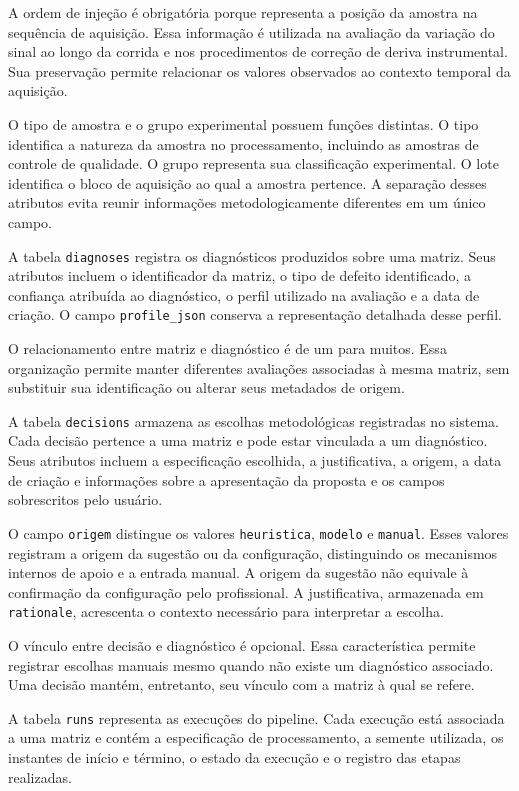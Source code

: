 A ordem de injeção é obrigatória porque representa a posição da amostra na sequência de aquisição. Essa informação é utilizada na avaliação da variação do sinal ao longo da corrida e nos procedimentos de correção de deriva instrumental. Sua preservação permite relacionar os valores observados ao contexto temporal da aquisição.

O tipo de amostra e o grupo experimental possuem funções distintas. O tipo identifica a natureza da amostra no processamento, incluindo as amostras de controle de qualidade. O grupo representa sua classificação experimental. O lote identifica o bloco de aquisição ao qual a amostra pertence. A separação desses atributos evita reunir informações metodologicamente diferentes em um único campo.

A tabela \texttt{diagnoses} registra os diagnósticos produzidos sobre uma matriz. Seus atributos incluem o identificador da matriz, o tipo de defeito identificado, a confiança atribuída ao diagnóstico, o perfil utilizado na avaliação e a data de criação. O campo \texttt{profile\_json} conserva a representação detalhada desse perfil.

O relacionamento entre matriz e diagnóstico é de um para muitos. Essa organização permite manter diferentes avaliações associadas à mesma matriz, sem substituir sua identificação ou alterar seus metadados de origem.

A tabela \texttt{decisions} armazena as escolhas metodológicas registradas no sistema. Cada decisão pertence a uma matriz e pode estar vinculada a um diagnóstico. Seus atributos incluem a especificação escolhida, a justificativa, a origem, a data de criação e informações sobre a apresentação da proposta e os campos sobrescritos pelo usuário.

O campo \texttt{origem} distingue os valores \texttt{heuristica}, \texttt{modelo} e \texttt{manual}. Esses valores registram a origem da sugestão ou da configuração, distinguindo os mecanismos internos de apoio e a entrada manual. A origem da sugestão não equivale à confirmação da configuração pelo profissional. A justificativa, armazenada em \texttt{rationale}, acrescenta o contexto necessário para interpretar a escolha.

O vínculo entre decisão e diagnóstico é opcional. Essa característica permite registrar escolhas manuais mesmo quando não existe um diagnóstico associado. Uma decisão mantém, entretanto, seu vínculo com a matriz à qual se refere.

A tabela \texttt{runs} representa as execuções do pipeline. Cada execução está associada a uma matriz e contém a especificação de processamento, a semente utilizada, os instantes de início e término, o estado da execução e o registro das etapas realizadas.

